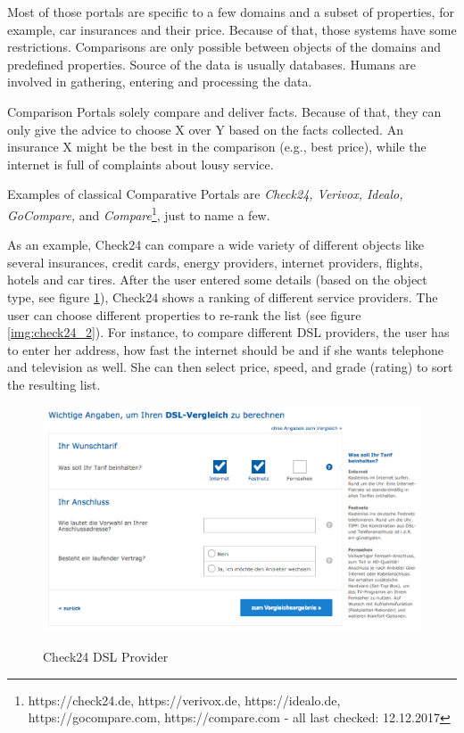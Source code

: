 Most of those portals are specific to a few domains and a subset of properties, for example, car insurances and their price. Because of that, those systems have some restrictions. Comparisons are only possible between objects of the domains and predefined properties. Source of the data is usually databases. Humans are involved in gathering, entering and processing the data.

Comparison Portals solely compare and deliver facts. Because of that, they can only give the advice to choose X over Y based on the facts collected.  An insurance X might be the best in the comparison (e.g., best price), while the internet is full of complaints about lousy service.\newline

Examples of classical Comparative Portals are \emph{Check24, Verivox, Idealo, GoCompare,} and \emph{Compare}\footnote{https://check24.de, https://verivox.de, https://idealo.de, https://gocompare.com, https://compare.com - all last checked: 12.12.2017}, just to name a few.

As an example, Check24 can compare a wide variety of different objects like several insurances, credit cards, energy providers, internet providers, flights, hotels and car tires. After the user entered some details (based on the object type, see figure \ref{img:check24_1}), Check24 shows a ranking of different service providers. The user can choose different properties to re-rank the list (see figure \ref{img:check24_2}).
For instance, to compare different DSL providers, the user has to enter her address, how fast the internet should be and if she wants telephone and television as well. She can then select price, speed, and grade (rating) to sort the resulting list.

\begin{figure}[h]
\includegraphics[width=1\textwidth]{images/ds-sys/check24_1}
\label{img:check24_1}
\caption{Check24 DSL Provider}
\end{figure}

